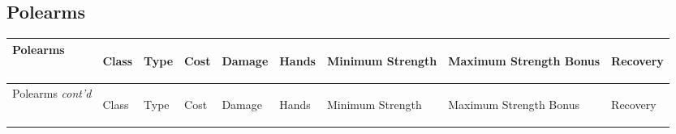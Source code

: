 \documentclass[twoside]{book}
\begin{document}
    

\subsection{Polearms}
    
\begin{longtable}{p{1.25in}llllp{2em}p{3em}p{3em}l} 
  Polearms& \begin{turn}{70}{Class}\end{turn}
          & \begin{turn}{70}{Type}\end{turn}
          & \begin{turn}{70}{Cost}\end{turn}
          & \begin{turn}{70}{Damage}\end{turn}
          & \begin{turn}{70}{Hands}\end{turn}
          & \begin{turn}{70}{Minimum Strength}\end{turn}
          & \begin{turn}{70}{Maximum Strength Bonus}\end{turn}
          & \begin{turn}{70}{Recovery}\end{turn}
          \\
  \hline
  \hline
  \endfirsthead
  Polearms \textit{cont'd}
        & \begin{turn}{70}{Class}\end{turn}
          & \begin{turn}{70}{Type}\end{turn}
          & \begin{turn}{70}{Cost}\end{turn}
          & \begin{turn}{70}{Damage}\end{turn}
          & \begin{turn}{70}{Hands}\end{turn}
          & \begin{turn}{70}{Minimum Strength}\end{turn}
          & \begin{turn}{70}{Maximum Strength Bonus}\end{turn}
          & \begin{turn}{70}{Recovery}\end{turn}
           \\

\end{longtable}
\end{document}
